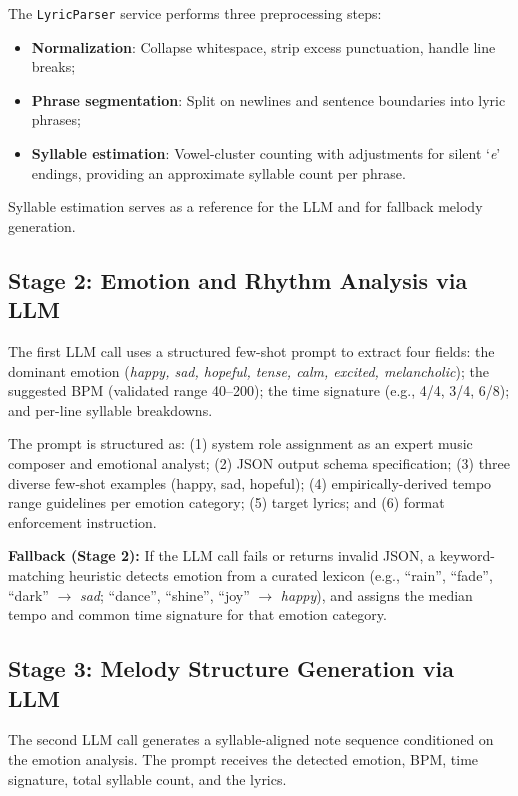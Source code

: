 \documentclass[conference]{IEEEtran}
\begin{document}
The \texttt{LyricParser} service performs three preprocessing steps:
\begin{itemize}
  \item \textbf{Normalization}: Collapse whitespace, strip excess punctuation,
        handle line breaks;
  \item \textbf{Phrase segmentation}: Split on newlines and sentence boundaries
        into lyric phrases;
  \item \textbf{Syllable estimation}: Vowel-cluster counting with adjustments
        for silent `\textit{e}' endings, providing an approximate syllable count
        per phrase.
\end{itemize}
Syllable estimation serves as a reference for the LLM and for fallback melody
generation.

\subsection{Stage 2: Emotion and Rhythm Analysis via LLM}

The first LLM call uses a structured few-shot prompt to extract four fields:
the dominant emotion (\textit{happy, sad, hopeful, tense, calm, excited,
melancholic}); the suggested BPM (validated range 40--200); the time signature
(e.g., 4/4, 3/4, 6/8); and per-line syllable breakdowns.

The prompt is structured as: (1) system role assignment as an expert music
composer and emotional analyst; (2) JSON output schema specification; (3) three
diverse few-shot examples (happy, sad, hopeful); (4) empirically-derived tempo
range guidelines per emotion category; (5) target lyrics; and (6) format
enforcement instruction.

\textbf{Fallback (Stage 2):} If the LLM call fails or returns invalid JSON,
a keyword-matching heuristic detects emotion from a curated lexicon (e.g.,
``rain'', ``fade'', ``dark'' $\to$ \textit{sad}; ``dance'', ``shine'', ``joy''
$\to$ \textit{happy}), and assigns the median tempo and common time signature
for that emotion category.

\subsection{Stage 3: Melody Structure Generation via LLM}

The second LLM call generates a syllable-aligned note sequence conditioned on
the emotion analysis. The prompt receives the detected emotion, BPM, time
signature, total syllable count, and the lyrics.
\end{document}
